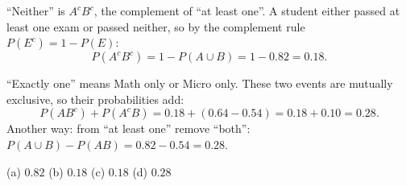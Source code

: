 \begin{solution}
	 ``Neither'' is $A^cB^c$, the complement of ``at least one''. A
	student either passed at least one exam or passed neither, so by the
	complement rule $P(E^c)=1-P(E)$:
	\[ P(A^cB^c)=1-P(A\cup B)=1-0.82=0.18. \]

	 ``Exactly one'' means Math only or Micro only. These two events
	are mutually exclusive, so their probabilities add:
	\[ P(AB^c)+P(A^cB)=0.18+(0.64-0.54)=0.18+0.10=0.28. \]
	Another way: from ``at least one'' remove ``both'':
	$P(A\cup B)-P(AB)=0.82-0.54=0.28$.
	\begin{answer}
		(a) $0.82$ \quad (b) $0.18$ \quad (c) $0.18$ \quad (d) $0.28$
	\end{answer}
\end{solution}
